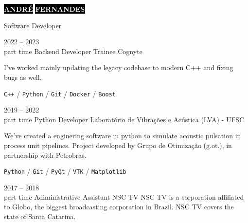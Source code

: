 \documentclass[11pt]{developercv} %
\begin{document}

\begin{minipage}[t]{0.45\textwidth} %
	\vspace{-\baselineskip} %
	
	\colorbox{black}{{\HUGE\textcolor{white}{\textbf{\MakeUppercase{André}}}}} %
	\colorbox{black}{{\HUGE\textcolor{white}{\textbf{\MakeUppercase{Fernandes}}}}} %
	\vspace{6pt}
 
	{\fontsize{15}{15} \selectfont Software Developer} %
 
\end{minipage}
\hfill
\begin{minipage}[t]{0.275\textwidth} %
	
 
 
\end{minipage}

\vspace{0.5cm}




\begin{entrylist}
	\entry
		{2022 -- 2023 \\ \footnotesize{part time}}
		{Backend Developer Trainee}
		{Cognyte}
		{
            I've worked mainly updating the legacy codebase to modern C++ and fixing bugs as well.
            
            \texttt{C++} / \texttt{Python} / \texttt{Git} / \texttt{Docker} / \texttt{Boost}
        }
	\entry
		{2019 -- 2022\\\footnotesize{part time}}
		{Python Developer}
		{Laboratório de Vibrações e Acústica (LVA) - UFSC}
		{ 
            We've created a enginering software in python to simulate acoustic pulsation in process unit pipelines. Project developed by Grupo de Otimização (g.ot.), in partnership with Petrobras.
            
            \texttt{Python} / \texttt{Git} / \texttt{PyQt} / \texttt{VTK} / \texttt{Matplotlib}
        }
	\entry
		{2017 -- 2018 \\ \footnotesize{part time}}
		{Adiministrative Assistant}
		{NSC TV}
		{
            NSC TV is a corporation affiliated to Globo, the biggest broadcasting corporation in Brazil. NSC TV covers the state of Santa Catarina. 
        }
\end{entrylist}
\end{document}
